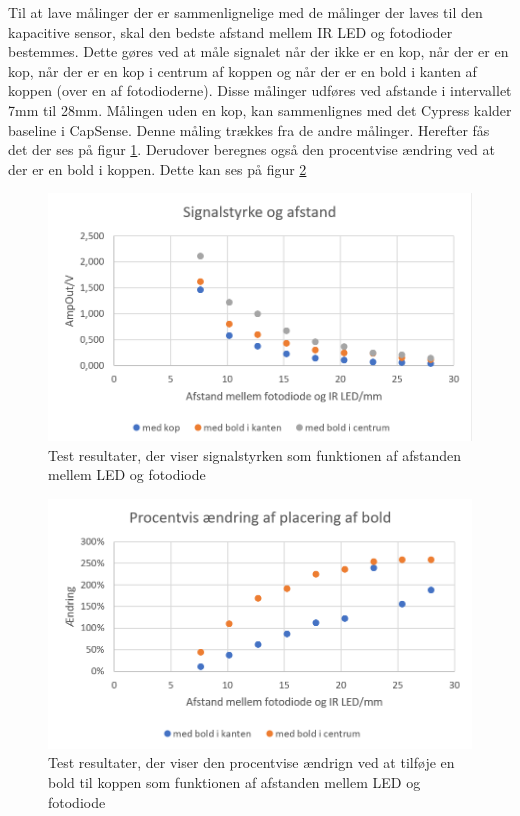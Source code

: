 \documentclass[HardwareDesign/HardwareDesign_main.tex]{subfiles}
\begin{document}
Til at lave målinger der er sammenlignelige med de målinger der laves til den kapacitive sensor, skal den bedste afstand mellem IR LED og fotodioder bestemmes. Dette gøres ved at måle signalet når der ikke er en kop, når der er en kop, når der er en kop i centrum af koppen og når der er en bold i kanten af koppen (over en af fotodioderne). Disse målinger udføres ved afstande i intervallet 7mm til 28mm.
Målingen uden en kop, kan sammenlignes med det Cypress kalder baseline i CapSense. Denne måling trækkes fra de andre målinger. Herefter fås det der ses på figur \ref{fig:optic_test_afstand}. Derudover beregnes også den procentvise ændring ved at der er en bold i koppen. Dette kan ses på figur \ref{fig:optic_test_afstand_procent}

\begin{figure}[H]
    \centering
    \includegraphics[width=\textwidth]{HardwareDesign/CupSensor/graphics/OpticTest/beer_afstand.PNG}
    \caption{Test resultater, der viser signalstyrken som funktionen af afstanden mellem LED og fotodiode}
    \label{fig:optic_test_afstand}
\end{figure}

\begin{figure}[H]
    \centering
    \includegraphics[width=\textwidth]{HardwareDesign/CupSensor/graphics/OpticTest/beer_afstand_procent.PNG}
    \caption{Test resultater, der viser den procentvise ændrign ved at tilføje en bold til koppen som funktionen af afstanden mellem LED og fotodiode}
    \label{fig:optic_test_afstand_procent}
\end{figure}
\end{document}
